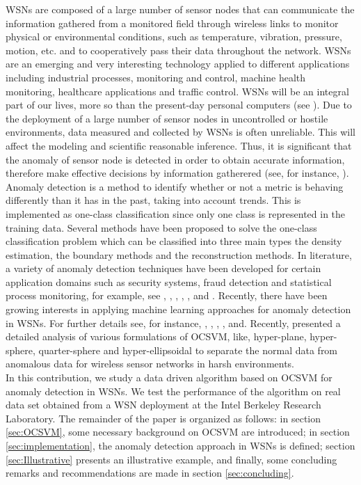 \documentclass[conference]{IEEEtran}
\begin{document}
WSNs are composed of a large number of sensor nodes that can communicate the information gathered from a monitored field through wireless links to monitor physical or environmental conditions, such as temperature, vibration, pressure, motion, etc. and to cooperatively pass their data throughout the network. WSNs are an emerging and very interesting technology applied to different applications including industrial processes, monitoring and control, machine health monitoring, healthcare applications and traffic control. WSNs will be an integral part of our lives, more so than the present-day personal computers (see \cite{Xie2011}). Due to the deployment of a large number of sensor nodes in uncontrolled or hostile environments, data measured and collected by WSNs is often  unreliable. This will affect the modeling and scientific reasonable inference. Thus, it is significant that the anomaly of sensor node is detected in order to obtain accurate information, therefore make effective decisions by information gatherered (see, for instance, \cite{sharma2010sensor}).\\

Anomaly detection is a method to identify whether or not a metric is behaving differently than it has in the past, taking into account trends. This is implemented as one-class classification since only one class is represented in the training data. Several methods have been proposed to solve the one-class classification problem which can be classified into three main types the density estimation, the boundary methods and the reconstruction methods. In literature, a variety of anomaly detection techniques have been developed for certain application domains such as security systems, fraud detection and statistical process monitoring, for example, see \cite{ilonen2006gaussian}, \cite{clifton2011novelty}, \cite{Tran2015a}, \cite{Tran2015b}, \cite{Chandola2016}, \cite{Tran2016} and \cite{Tran2016c}. Recently, there have been growing interests in applying machine learning approaches for anomaly detection in WSNs. For further details see, for instance, \cite{sharma2010sensor}, \cite{Xie2011}, \cite{Rajasegarar2014}, \cite{Chandola2016}, and\cite{feng2017new}. Recently, \cite{shahid2015one} presented a detailed analysis of various formulations of OCSVM, like, hyper-plane, hyper-sphere, quarter-sphere and hyper-ellipsoidal to separate the normal data from anomalous data for wireless sensor networks in harsh environments.\\

In this contribution, we study a data driven algorithm based on OCSVM  for anomaly detection in WSNs. We test the performance of the algorithm on real data set obtained from a WSN deployment at the Intel Berkeley Research Laboratory. The remainder of the paper is organized as follows: in section \ref{sec:OCSVM}, some necessary background on OCSVM are introduced; in section \ref{sec:implementation}, the anomaly detection approach in WSNs is defined; section \ref{sec:Illustrative} presents an illustrative example, and finally, some concluding remarks and recommendations are made in section \ref{sec:concluding}.
\end{document}
